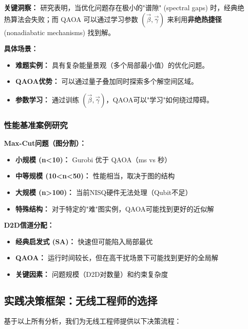 \documentclass[11pt,a4paper]{article}
\begin{document}
\textbf{关键洞察：} 研究表明，当优化问题存在极小的"谱隙" (spectral gaps) 时，经典绝热算法会失败；而 QAOA 可以通过学习参数 $(\vec{\beta}, \vec{\gamma})$ 来利用\textbf{非绝热捷径} (nonadiabatic mechanisms) 找到解。

\textbf{具体场景：}
\begin{itemize}
\item \textbf{难题实例：} 具有复杂能量景观（多个局部最小值）的优化问题。
\item \textbf{QAOA优势：} 可以通过量子叠加同时探索多个解空间区域。
\item \textbf{参数学习：} 通过训练 $(\vec{\beta}, \vec{\gamma})$，QAOA可以"学习"如何绕过障碍。
\end{itemize}

\subsubsection{性能基准案例研究}

\textbf{Max-Cut问题（图分割）：}
\begin{itemize}
\item \textbf{小规模 (n<10)：} Gurobi 优于 QAOA（ms vs 秒）
\item \textbf{中等规模 (10<n<50)：} 性能相当，取决于图的结构
\item \textbf{大规模 (n>100)：} 当前NISQ硬件无法处理（Qubit不足）
\item \textbf{特殊结构：} 对于特定的"难"图实例，QAOA可能找到更好的近似解
\end{itemize}

\textbf{D2D信道分配：}
\begin{itemize}
\item \textbf{经典启发式 (SA)：} 快速但可能陷入局部最优
\item \textbf{QAOA：} 运行时间较长，但在高干扰场景下可能找到更好的全局解
\item \textbf{关键因素：} 问题规模（D2D对数量）和约束复杂度
\end{itemize}

\subsection{实践决策框架：无线工程师的选择}

基于以上所有分析，我们为无线工程师提供以下决策流程：
\end{document}
